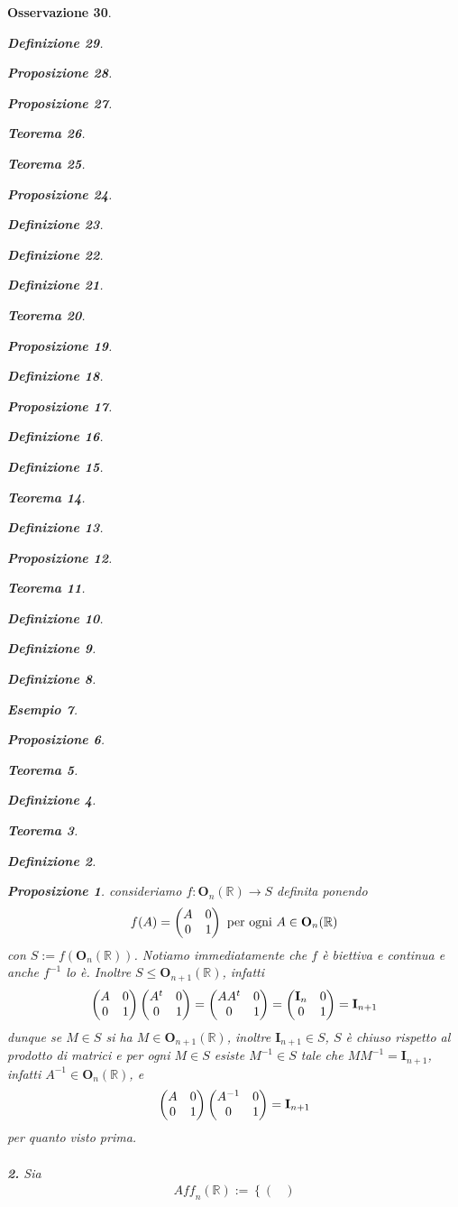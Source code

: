 \documentclass[oneside, 11pt]{amsbook}
\makeatletter
\newcommand{\0}{{(0)}}
\newcommand{\3}{{(3)}}
\theoremstyle{colonplain}
\newtheorem{thm}{Teorema}[chapter]
\newtheorem{prop}[thm]{Proposizione}
\theoremstyle{colondefinition}
\newtheorem{defn}[thm]{Definizione}
\newtheorem{ex}[thm]{Esempio}
\theoremstyle{colonremark}
\newtheorem{rmk}[thm]{Osservazione}
\numberwithin{equation}{chapter}
\renewcommand{\proofname}{Dimostrazione}
\renewenvironment{proof}[1][\proofname]{\par
  \pushQED{\end{proof}}%
  \normalfont \topsep6\p@\@plus6\p@\relax
  \trivlist
  \item[\hskip\labelsep\bfseries #1:]\ignorespaces
}{%
  \popQED\endtrivlist\@endpefalse
}
\makeatother
\begin{document}
\begin{rmk}
\begin{defn}
\begin{prop}
\begin{prop}
\begin{thm}
\begin{thm}
\begin{prop}
\begin{defn}
\begin{defn}
\begin{defn}
\begin{thm}
\begin{prop}
\begin{defn}
\begin{prop}
\begin{defn}
\begin{defn}
\begin{thm}
\begin{defn}
\begin{prop}
\begin{thm}
\begin{defn}
\begin{defn}
\begin{defn}
\begin{ex}
\begin{prop}
\begin{thm}
\begin{defn}
\begin{thm}
\begin{defn}
\begin{prop}
\begin{proof} consideriamo $f : \mathbf{O}_n(\mathbb{R}) \longrightarrow S$ definita ponendo
\begin{align}
    f(A) = \begin{pmatrix}
        A & 0 \\
        0 & 1
    \end{pmatrix} \text{ per ogni } A \in \mathbf{O}_n(\mathbb{R}) \notag
\end{align}
con $S := f(\mathbf{O}_n(\mathbb{R}))$. Notiamo immediatamente che $f$ è biettiva e continua e anche $f^{-1}$ lo è. Inoltre $S \leq \mathbf{O}_{n + 1}(\mathbb{R})$, infatti
\begin{align}
    \begin{pmatrix}
        A & 0 \\
        0 & 1
    \end{pmatrix}
    \begin{pmatrix}
        A^t & 0 \\
        0 & 1
    \end{pmatrix} = 
    \begin{pmatrix}
        AA^t & 0 \\
        0 & 1
    \end{pmatrix} = 
    \begin{pmatrix}
        \mathbf{I}_n & 0 \\
        0 & 1
    \end{pmatrix} = \mathbf{I}_{n + 1} \notag
\end{align}
dunque se $M \in S$ si ha $M \in \mathbf{O}_{n + 1}(\mathbb{R})$, inoltre $\mathbf{I}_{n + 1} \in S$, $S$ è chiuso rispetto al prodotto di matrici e per ogni $M \in S$ esiste $M^{-1} \in S$ tale che $MM^{-1} = \mathbf{I}_{n + 1}$, infatti $A^{-1} \in \mathbf{O}_n(\mathbb{R})$, e
\begin{align}
    \begin{pmatrix}
        A & 0 \\
        0 & 1
    \end{pmatrix}
    \begin{pmatrix}
        A^{-1} & 0 \\
        0 & 1
    \end{pmatrix} = 
    \mathbf{I}_{n + 1} \notag
\end{align}
per quanto visto prima. \\ \\
\textbf{2.} Sia
\begin{align}
    \textit{Aff}_n(\mathbb{R}) := \left\{ \begin{pmatrix}

\end{pmatrix}
\end{align}
\end{proof}
\end{prop}
\end{defn}
\end{thm}
\end{defn}
\end{thm}
\end{prop}
\end{ex}
\end{defn}
\end{defn}
\end{defn}
\end{thm}
\end{prop}
\end{defn}
\end{thm}
\end{defn}
\end{defn}
\end{prop}
\end{defn}
\end{prop}
\end{thm}
\end{defn}
\end{defn}
\end{defn}
\end{prop}
\end{thm}
\end{thm}
\end{prop}
\end{prop}
\end{defn}
\end{rmk}
\end{document}
